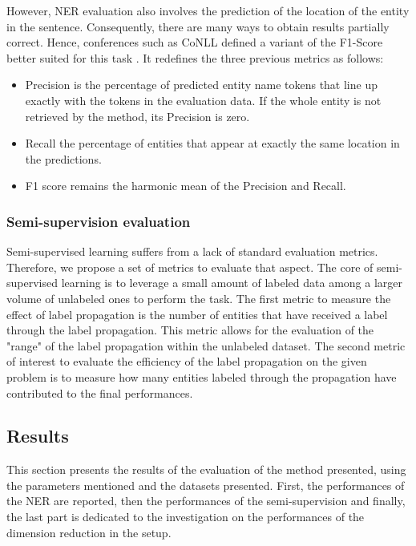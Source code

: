 However, NER evaluation also involves the prediction of the location of the entity in the sentence.
Consequently, there are many ways to obtain results partially correct.
Hence, conferences such as CoNLL defined a variant of the F1-Score better suited for this task \parencite{tjongkimsangIntroductionCoNLL2003Shared2003}.
It redefines the three previous metrics as follows:

\begin{itemize}
    \item Precision is the percentage of predicted entity name tokens that line up exactly with the tokens in the evaluation data.
          If the whole entity is not retrieved by the method, its Precision is zero.
    \item Recall the percentage of entities that appear at exactly the same location in the predictions.
    \item F1 score remains the harmonic mean of the Precision and Recall.
\end{itemize}

\subsubsection{Semi-supervision evaluation}
Semi-supervised learning suffers from a lack of standard evaluation metrics.
Therefore, we propose a set of metrics to evaluate that aspect.
The core of semi-supervised learning is to leverage a small amount of labeled data among a larger volume of unlabeled ones to perform the task.
The first metric to measure the effect of label propagation is the number of entities that have received a label through the label propagation.
This metric allows for the evaluation of the "range" of the label propagation within the unlabeled dataset.
The second metric of interest to evaluate the efficiency of the label propagation on the given problem is to measure how many entities labeled through the propagation have contributed to the final performances.

\subsection{Results}
This section presents the results of the evaluation of the method presented, using the
parameters mentioned and the datasets presented.
First, the performances of the NER are reported, then the performances of the semi-supervision
and finally, the last part is dedicated to the investigation on the performances of the
dimension reduction in the setup.

